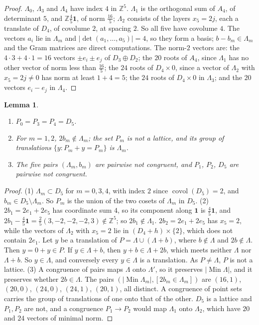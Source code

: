 \documentclass[11pt]{amsart}
\newtheorem{lemma}[theorem]{Lemma}
\theoremstyle{definition}
\theoremstyle{remark}
\numberwithin{equation}{section}
\numberwithin{table}{section}
\numberwithin{figure}{section}
\newcommand{\Z}{\mathbb{Z}}
\newcommand{\Min}{\operatorname{Min}}
\newcommand{\covol}{\operatorname{covol}}
\newcommand{\one}{\mathbf{1}}
\begin{document}
\begin{proof}
$\Lambda_0$, $\Lambda_3$ and $\Lambda_4$ have index $4$ in $\Z^5$. $\Lambda_1$ is the orthogonal sum of $A_4$, of determinant $5$, and $\Z\frac45\one$, of norm $\frac{16}5$; $\Lambda_2$ consists of the layers $x_5=2j$, each a translate of $D_4$, of covolume $2$, at spacing $2$. So all five have covolume $4$. The vectors $a_i$ lie in $\Lambda_m$ and $|\det(a_1,\dots,a_5)|=4$, so they form a basis; $b-b_m\in\Lambda_m$ and the Gram matrices are direct computations. The norm-$2$ vectors are: the $4\cdot3+4\cdot1=16$ vectors $\pm e_i\pm e_j$ of $D_3\oplus D_2$; the $20$ roots of $A_4$, since $\Lambda_1$ has no other vector of norm less than $\frac{16}5$; the $24$ roots of $D_4\times0$, since a vector of $\Lambda_2$ with $x_5=2j\ne0$ has norm at least $1+4=5$; the $24$ roots of $D_4\times0$ in $\Lambda_3$; and the $20$ vectors $e_i-e_j$ in $\Lambda_4$.
\end{proof}

\begin{lemma}\label{lem:noncongruent}
\begin{enumerate}
\item $P_0=P_3=P_4=D_5$.
\item For $m=1,2$, $2b_m\notin\Lambda_m$; the set $P_m$ is not a lattice, and its group of translations $\{y:P_m+y=P_m\}$ is $\Lambda_m$.
\item The five pairs $(\Lambda_m,b_m)$ are pairwise not congruent, and $P_1$, $P_2$, $D_5$ are pairwise not congruent.
\end{enumerate}
\end{lemma}

\begin{proof}
(1) $\Lambda_m\subset D_5$ for $m=0,3,4$, with index $2$ since $\covol(D_5)=2$, and $b_m\in D_5\setminus\Lambda_m$. So $P_m$ is the union of the two cosets of $\Lambda_m$ in $D_5$.
(2) $2b_1=2e_1+2e_5$ has coordinate sum $4$, so its component along $\one$ is $\frac45\one$, and $2b_1-\frac45\one=\frac25(3,-2,-2,-2,3)\notin\Z^5$; so $2b_1\notin\Lambda_1$. $2b_2=2e_1+2e_5$ has $x_5=2$, while the vectors of $\Lambda_2$ with $x_5=2$ lie in $(D_4+h)\times\{2\}$, which does not contain $2e_1$. Let $y$ be a translation of $P=\Lambda\cup(\Lambda+b)$, where $b\notin\Lambda$ and $2b\notin\Lambda$. Then $y=0+y\in P$. If $y\in\Lambda+b$, then $y+b\in\Lambda+2b$, which meets neither $\Lambda$ nor $\Lambda+b$. So $y\in\Lambda$, and conversely every $y\in\Lambda$ is a translation. As $P\ne\Lambda$, $P$ is not a lattice.
(3) A congruence of pairs maps $\Lambda$ onto $\Lambda'$, so it preserves $|\Min\Lambda|$, and it preserves whether $2b\in\Lambda$. The pairs $(|\Min\Lambda_m|,[2b_m\in\Lambda_m])$ are $(16,1)$, $(20,0)$, $(24,0)$, $(24,1)$, $(20,1)$, all distinct. A congruence of point sets carries the group of translations of one onto that of the other. $D_5$ is a lattice and $P_1,P_2$ are not, and a congruence $P_1\to P_2$ would map $\Lambda_1$ onto $\Lambda_2$, which have $20$ and $24$ vectors of minimal norm.
\end{proof}
\end{document}
